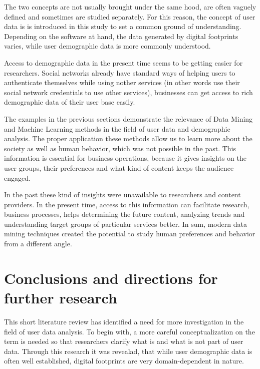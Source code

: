 \documentclass[conference]{IEEEtran}
\begin{document}
The two concepts are not usually brought under the same hood, are often vaguely defined and sometimes are studied separately. For this reason, the concept of user data is is introduced in this study to set a common ground of understanding. Depending on the software at hand, the data generated by digital footprints varies, while user demographic data is more commonly understood. 

Access to demographic data in the present time seems to be getting easier for researchers. Social networks already have standard ways of helping users to authenticate themselves while using nother services (in other words use their social network credentials to use other services), businesses can get access to rich demographic data of their user base easily.  

The examples in the previous sections demonstrate the relevance of Data Mining and Machine Learning methods in the field of user data and demographic analysis. The proper application these methods allow us to learn more about the society as well as human behavior, which was not possible in the past. This information is essential for business operations, because it gives insights on the user groups, their preferences and what kind of content keeps the audience engaged. 

In the past these kind of insights were unavailable to researchers and content providers. In the present time, access to this information can facilitate research, business processes, helps determining the future content, analyzing trends and understanding target groups of particular services better. In sum, modern data mining techniques created the potential to study human preferences and behavior from a different angle.

\section{Conclusions and directions for further research} 
This short literature review has identified a need for more investigation in the field of user data analysis. To begin with, a more careful conceptualization on the term is needed so that researchers clarify what is and what is not part of user data. Through this research it was revealad, that while user demographic data is often well established, digital footprints are very domain-dependent in nature. 
\end{document}
